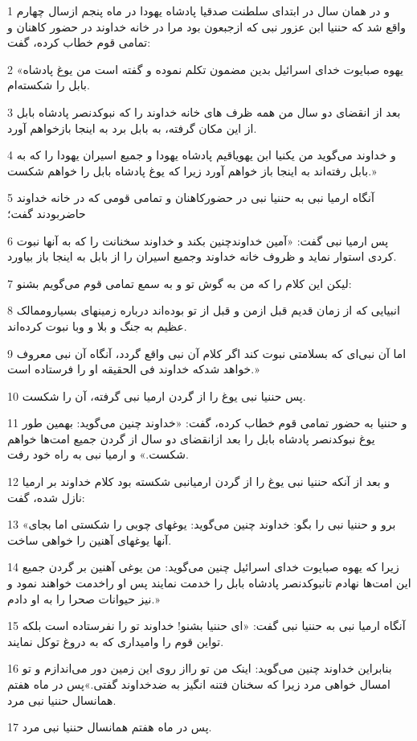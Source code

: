 \par 1 و در همان سال در ابتدای سلطنت صدقیا پادشاه یهودا در ماه پنجم ازسال چهارم واقع شد که حننیا ابن عزور نبی که ازجبعون بود مرا در خانه خداوند در حضور کاهنان و تمامی قوم خطاب کرده، گفت:
\par 2 «یهوه صبایوت خدای اسرائیل بدین مضمون تکلم نموده و گفته است من یوغ پادشاه بابل را شکسته‌ام.
\par 3 بعد از انقضای دو سال من همه ظرف های خانه خداوند را که نبوکدنصر پادشاه بابل از این مکان گرفته، به بابل برد به اینجا بازخواهم آورد.
\par 4 و خداوند می‌گوید من یکنیا ابن یهویاقیم پادشاه یهودا و جمیع اسیران یهودا را که به بابل رفته‌اند به اینجا باز خواهم آورد زیرا که یوغ پادشاه بابل را خواهم شکست.»
\par 5 آنگاه ارمیا نبی به حننیا نبی در حضورکاهنان و تمامی قومی که در خانه خداوند حاضربودند گفت؛
\par 6 پس ارمیا نبی گفت: «آمین خداوندچنین بکند و خداوند سخنانت را که به آنها نبوت کردی استوار نماید و ظروف خانه خداوند وجمیع اسیران را از بابل به اینجا باز بیاورد.
\par 7 لیکن این کلام را که من به گوش تو و به سمع تمامی قوم می‌گویم بشنو:
\par 8 انبیایی که از زمان قدیم قبل ازمن و قبل از تو بوده‌اند درباره زمینهای بسیاروممالک عظیم به جنگ و بلا و وبا نبوت کرده‌اند.
\par 9 اما آن نبی‌ای که بسلامتی نبوت کند اگر کلام آن نبی واقع گردد، آنگاه آن نبی معروف خواهد شدکه خداوند فی الحقیقه او را فرستاده است.»
\par 10 پس حننیا نبی یوغ را از گردن ارمیا نبی گرفته، آن را شکست.
\par 11 و حننیا به حضور تمامی قوم خطاب کرده، گفت: «خداوند چنین می‌گوید: بهمین طور یوغ نبوکدنصر پادشاه بابل را بعد ازانقضای دو سال از گردن جمیع امت‌ها خواهم شکست.» و ارمیا نبی به راه خود رفت.
\par 12 و بعد از آنکه حننیا نبی یوغ را از گردن ارمیانبی شکسته بود کلام خداوند بر ارمیا نازل شده، گفت:
\par 13 «برو و حننیا نبی را بگو: خداوند چنین می‌گوید: یوغهای چوبی را شکستی اما بجای آنها یوغهای آهنین را خواهی ساخت.
\par 14 زیرا که یهوه صبایوت خدای اسرائیل چنین می‌گوید: من یوغی آهنین بر گردن جمیع این امت‌ها نهادم تانبوکدنصر پادشاه بابل را خدمت نمایند پس او راخدمت خواهند نمود و نیز حیوانات صحرا را به او دادم.»
\par 15 آنگاه ارمیا نبی به حننیا نبی گفت: «ای حننیا بشنو! خداوند تو را نفرستاده است بلکه تواین قوم را وامیداری که به دروغ توکل نمایند.
\par 16 بنابراین خداوند چنین می‌گوید: اینک من تو رااز روی این زمین دور می‌اندازم و تو امسال خواهی مرد زیرا که سخنان فتنه انگیز به ضدخداوند گفتی.»پس در ماه هفتم همانسال حننیا نبی مرد.
\par 17 پس در ماه هفتم همانسال حننیا نبی مرد.
 
